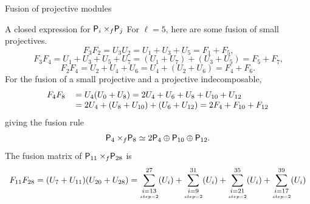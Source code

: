 \documentclass[reqno]{amsart}
\newcommand{\ds}[1]{\mathsf S_{#1}}
\newcommand{\dP}[1]{\mathsf P_{#1}}
\newcommand{\xf}{\times\hspace{-0.27em}_f}
\newcommand{\F}[1]{F_{#1}}
\newcommand{\U}[1]{U_{#1}}
\newcommand{\lc}{\ell}
\begin{document}
\begin{section}{Fusion of projective modules}
\begin{subsection}{A closed expression for $\dP{i} \xf \dP{j}$}
For $\lc=5$, here are some fusion of small projectives.
 \begin{equation}
 \F{3}\F{2}= \U{3}\U{2} = \U{1} + \U{3} + \U{5} = \F{1} + \F{5} \text{,}
 \end{equation}
 \begin{equation}
 \F{3}\F{4} = \U{1} + \U{3} +\U{5} + \U{7} = (\U{1} + \U{7}) + (\U{3} + \U{5}) = \F{5} + \F{7} \text{,}
 \end{equation}
 \begin{equation}
 \F{2}\F{4} = \U{2} + \U{4} + \U{6} = \U{4} + (\U{2} + \U{6}) = \F{4} + \F{6}\text{.}
 \end{equation}
For the fusion of a small projective and a projective indecomposable,
\begin{equation}
\begin{tabular}{r l}
$\F{4}\F{8} $&$= \U{4}(\U{0} + \U{8}) = 2 \U{4} + \U{6} + \U{8} + \U{10} + \U{12}$\\
&$ = 2\U{4} + (\U{8} + \U{10}) + (\U{6} + \U{12}) = 2\F{4} + \F{10} + \F{12}$
\end{tabular}
\end{equation}
giving the fusion rule
\begin{equation}
\dP{4} \xf \dP{8} \simeq 2\dP{4} \oplus \dP{10} \oplus \dP{12} \text{.}
\end{equation}
The fusion matrix of $\dP{11} \xf \dP{28}$ is
\begin{align}
\F{11}\F{28} & =  (\U{7} + \U{11})(\U{20} + \U{28}) = \sum_{\underset{step =2}{i = 13}}^{27}(\U{i}) + \sum_{\underset{step =2}{i = 9}}^{31}(\U{i})+\sum_{\underset{step =2}{i = 21}}^{35}(\U{i})+\sum_{\underset{step =2}{i = 17}}^{39}(\U{i})\notag \\

\end{align}
\end{subsection}
\end{section}
\end{document}
